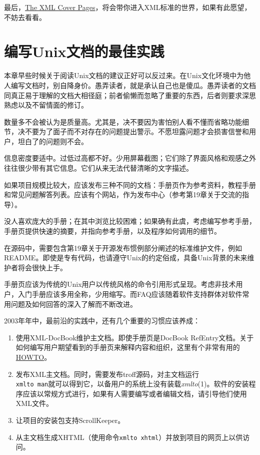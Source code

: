 \documentclass[12pt,oneside]{ctexbook}
\begin{document}
\begin{common-format}
最后，\href{http://xml.coverpages.org/}{The XML Cover Pages}，将会带你进入XML标准的世界，如果有此愿望，不妨去看看。

\section{编写Unix文档的最佳实践}
本章早些时候关于阅读Unix文档的建议正好可以反过来。在Unix文化环境中为他人编写文档时，别自降身价。愚弄读者，就是承认自己也是傻瓜。愚弄读者的文档同真正易于理解的文档大相径庭；前者偷懒而忽略了重要的东西，后者则要求深思熟虑以及不留情面的修订。

数量多不会被认为是质量高。尤其是，决不要因为害怕别人看不懂而省略功能细节，决不要为了面子而不对存在的问题提出警示。不愿坦露问题才会损害信誉和用户，坦白了的问题则不会。

信息密度要适中。过低过高都不好。少用屏幕截图；它们除了界面风格和观感之外往往很少带有其它信息。它们从来无法代替清晰的文字描述。

如果项目规模比较大，应该发布三种不同的文档：手册页作为参考资料，教程手册和常见问题解答列表。应该有个网站，作为发布中心（参考第19章关于交流的指导）。

没人喜欢庞大的手册；在其中浏览比较困难；如果确有此虞，考虑编写参考手册，手册页提供快速的摘要，并指向参考手册，以及程序如何调用的细节。

在源码中，需要包含第19章关于开源发布惯例部分阐述的标准维护文件，例如README。即使是专有代码，也请遵守Unix的约定俗成，具备Unix背景的未来维护者将会很快上手。

手册页应该为传统的Unix用户以传统风格的命令引用形式呈现。考虑非技术用户，入门手册应该多用全称，少用缩写。而FAQ应该随着软件支持群体对软件常用问题及如何回答的深入了解而不断改进。

2003年年中，最前沿的实践中，还有几个重要的习惯应该养成：
\begin{enumerate}
\item 使用XML-DocBook维护主文档。即使手册页是DocBook RefEntry文档。关于如何编写用户期望看到的手册页来解释内容和组织，这里有个非常有用的\href{http://www.tldp.org/HOWTO/mini/Man-Page.html}{HOWTO}。
\item 发布XML主文档。同时，需要发布troff源码，对主文档运行\\ \verb+xmlto man+就可以得到它，以备用户的系统上没有装载\textit{xmlto}(1)。软件的安装程序应该以常规方式进行，如果有人需要编写或者编辑文档，请引导他们使用XML文件。
\item 让项目的安装包支持ScrollKeeper。
\item 从主文档生成XHTML（使用命令\verb+xmlto xhtml+）并放到项目的网页上以供访问。
\end{enumerate}


\end{common-format}
\end{document}
